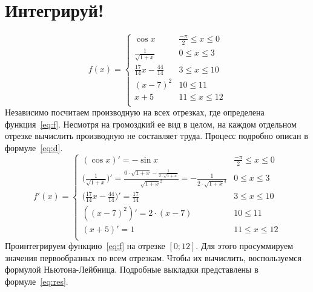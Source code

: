 \documentclass[30pt]{article}
\begin{document}
    \section{Интегрируй!}
        \begin{equation}
            f(x) = \begin{cases}
                \cos{x} & \frac{-\pi}{2} \leqslant x \leqslant 0 \\
                \frac{1}{\sqrt{1 + x}} & 0 \leqslant x \leqslant 3 \\
                \frac{17}{14}x - \frac{44}{14} & 3 \leqslant x \leqslant 10 \\
                (x - 7)^2 & 10 \leqslant  11 \\
                x + 5 & 11 \leqslant x \leqslant 12 \\
            \end{cases}
            \label{eq:f}
        \end{equation}
        Независимо посчитаем производную на всех отрезках, где определена функция~\eqref{eq:f}. Несмотря на громоздкий ее вид в целом, на каждом отдельном отрезке вычислить производную не составляет труда. Процесс подробно описан в формуле~\eqref{eq:d}.
        \begin{equation}
            f'(x) = \begin{cases}
                (\cos{x})' = -\sin{x} & \frac{-\pi}{2} \leqslant x \leqslant 0 \\
                \bigl(\frac{1}{\sqrt{1 + x}}\bigr)' = \frac{0 \cdot \sqrt{1 + x} - \frac{1}{2 \cdot \sqrt{1 + x}}}{\sqrt{1 + x}^2} = -\frac{1}{2 \cdot \sqrt{1 + x}^3} & 0 \leqslant x \leqslant 3 \\
                \bigl(\frac{17}{14}x - \frac{44}{14}\bigr)' = \frac{17}{14} & 3 \leqslant x \leqslant 10 \\
                ((x - 7)^2)' = 2 \cdot (x - 7) & 10 \leqslant  11 \\
                (x + 5)' = 1 & 11 \leqslant x \leqslant 12 \\
            \end{cases}
            \label{eq:d}
        \end{equation}
        Проинтегрируем функцию~\eqref{eq:f} на отрезке $[0;12]$. Для этого просуммируем значения первообразных по всем отрезкам. Чтобы их вычислить, воспользуемся формулой Ньютона-Лейбница. Подробные выкладки представлены в формуле~\eqref{eq:res}. 
\end{document}
